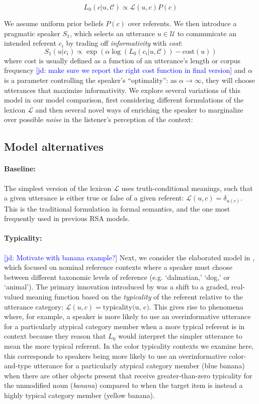 \documentclass[10pt,letterpaper]{article}
\newcommand{\jd}[1]{\textcolor{Blue}{[jd: #1]}}
\begin{document}
$$L_0(c | u, \mathcal{C}) \propto \mathcal{L}(u, c) P(c)$$

We assume uniform prior beliefs $P(c)$ over referents. We then introduce a pragmatic speaker $S_1$, which selects an utterance $u \in \mathcal{U}$ to communicate an intended referent $c_i$ by trading off \emph{informativity} with \emph{cost}:
$$S_1(u | c_i) \propto \exp\left( \alpha\log(L_0(c_i | u, \mathcal{C})) - \textrm{cost}(u) \right)$$
where cost is usually defined as a function of an utterance's length or corpus frequency \jd{make sure we report the right cost function in final version} and $\alpha$ is a parameter controlling the speaker's ``optimality'': as $\alpha\rightarrow \infty$, they will choose utterances that maximize informativity. We explore several variations of this model in our model comparison, first considering different formulations of the lexicon $\mathcal{L}$ and then  several novel ways of enriching the speaker to marginalize over possible \emph{noise} in the listener's perception of the context:

\subsection{Model alternatives}

\paragraph{Baseline:} The simplest version of the lexicon $\mathcal{L}$ uses truth-conditional meanings, such that a given utterance is either true or false of a given referent: $\mathcal{L}(u,c) = \delta_{u(c)}$. This is the traditional formulation in formal semantics, and the one most frequently used in previous RSA models. 

\paragraph{Typicality:} \jd{Motivate with banana example?} Next, we consider the elaborated model in , which focused on nominal reference contexts where a speaker must choose between different taxonomic levels of reference (e.g. `dalmatian,' `dog,' or `animal'). The primary innovation introduced by  was a shift to a graded, real-valued meaning function based on the \emph{typicality} of the referent relative to the utterance category: $\mathcal{L}(u,c) = \textrm{typicality(u, c)}$. This gives rise to phenomena where, for example, a speaker is more likely to use an overinformative utterance for a particularly atypical category member when a more typical referent is in context because they reason that $L_0$ would interpret the simpler utterance to mean the more typical referent. In the color typicality contexts we examine here, this corresponds to speakers being more likely to use an overinformative color-and-type utterance for  a particularly  atypical category member (blue banana) when there are other objects present that receive greater-than-zero  typicality for the unmodified noun (\emph{banana}) compared to when the target item is instead a highly typical category member (yellow banana). 
\end{document}
